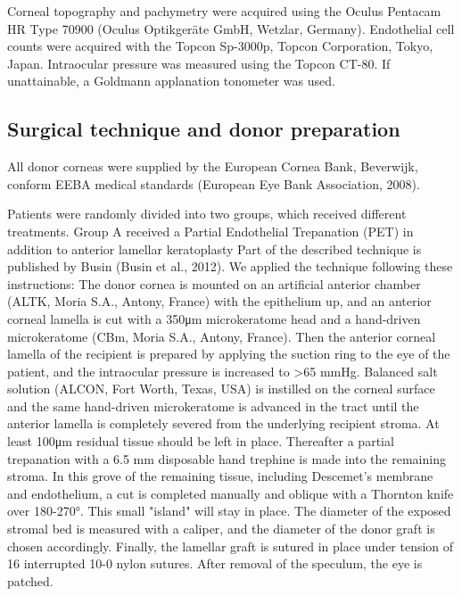 \documentclass[authordate, empirical,issue]{jote-new-article}
\begin{document}
	Corneal topography and pachymetry were acquired using the Oculus Pentacam HR Type 70900 (Oculus Optikgeräte GmbH, Wetzlar, Germany). Endothelial cell counts were acquired with the Topcon Sp-3000p, Topcon Corporation, Tokyo, Japan. Intraocular pressure was measured using the Topcon CT-80. If unattainable, a Goldmann applanation tonometer was used.



	\subsection{Surgical technique and donor preparation}



	All donor corneas were supplied by the European Cornea Bank, Beverwijk, conform EEBA medical standards (European Eye Bank Association, 2008).



	Patients were randomly divided into two groups, which received different treatments. Group A received a Partial Endothelial Trepanation (PET) in addition to anterior lamellar keratoplasty Part of the described technique is published by Busin (Busin et al., 2012).\textsuperscript{ }We applied the technique following these instructions: The donor cornea is mounted on an artificial anterior chamber (ALTK, Moria S.A., Antony, France) with the epithelium up, and an anterior corneal lamella is cut with a 350μm microkeratome head and a hand-driven microkeratome (CBm, Moria S.A., Antony, France). Then the anterior corneal lamella of the recipient is prepared by applying the suction ring to the eye of the patient, and the intraocular pressure is increased to >65 mmHg. Balanced salt solution (ALCON, Fort Worth, Texas, USA) is instilled on the corneal surface and the same hand-driven microkeratome is advanced in the tract until the anterior lamella is completely severed from the underlying recipient stroma. At least 100μm residual tissue should be left in place. Thereafter a partial trepanation with a 6.5 mm disposable hand trephine is made into the remaining stroma. In this grove of the remaining tissue, including Descemet's membrane and endothelium, a cut is completed manually and oblique with a Thornton knife over 180-270°. This small "island" will stay in place. The diameter of the exposed stromal bed is measured with a caliper, and the diameter of the donor graft is chosen accordingly. Finally, the lamellar graft is sutured in place under tension of 16 interrupted 10-0 nylon sutures. After removal of the speculum, the eye is patched.
\end{document}
